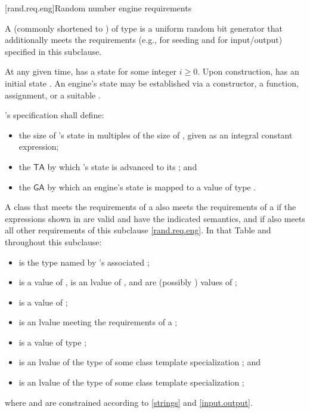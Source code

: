[rand.req.eng]{Random number engine requirements}%
%

\pnum
A 
(commonly shortened to )
 of type 
is a uniform random bit generator
that additionally meets the requirements
(e.g., for seeding and for input/output)
specified in this subclause.

\pnum
At any given time,
 has a state 
for some integer $i \geq 0$.
Upon construction,
has an initial state .
An engine's state may be established via
 a constructor,
 a  function,
 assignment,
 or a suitable .

\pnum
{}'s specification shall define:
\begin{itemize}
 \item
   the size of 's state
   in multiples of the size of ,
   given as an integral constant expression;
 \item
   the 
   $\mathsf{TA}$
   by which 's state 
   is advanced to its 
   ;
 and
 \item
   the 
   $\mathsf{GA}$
   by which an engine's state is mapped
   to a value of type .
\end{itemize}

\pnum
A class 
that meets the requirements
of a 
also meets the requirements
of a 
if the expressions shown
in 
are valid and have the indicated semantics,
and if  also meets all other requirements
of this subclause \ref{rand.req.eng}.
In that Table and throughout this subclause:
\begin{itemize}
  \item
     is the type named by
    's associated ;
  \item
     is a value of ,
     is an lvalue of ,
     and  are (possibly ) values of ;
  \item
     is a value of ;
  \item
     is an lvalue
    meeting the requirements of a ;
  \item
     is a value
    of type ;
  \item
     is an lvalue of the type of some class template specialization
     ;
  and
  \item
     is an lvalue of the type of some class template specialization
     ;
\end{itemize}
where  and  are constrained
according to \ref{strings} and \ref{input.output}.

